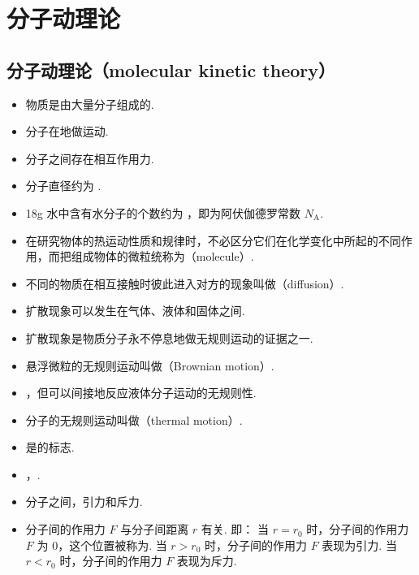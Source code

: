 \section{分子动理论}

\subsection{分子动理论（molecular kinetic theory）}
\vspace{10pt}
\begin{itemize}
\item 物质是由大量分子组成的.
\item 分子在地做运动.
\item 分子之间存在相互作用力.
\item 分子直径约为 .
\item 18g 水中含有水分子的个数约为 ，即为阿伏伽德罗常数 $N_{\text{A}}$.
\item 在研究物体的热运动性质和规律时，不必区分它们在化学变化中所起的不同作用，而把组成物体的微粒统称为（molecule）.
\item 不同的物质在相互接触时彼此进入对方的现象叫做（diffusion）.
\item 扩散现象可以发生在气体、液体和固体之间.
\item 扩散现象是物质分子永不停息地做无规则运动的证据之一.
\item 悬浮微粒的无规则运动叫做（Brownian motion）.
\item {}，但可以间接地反应液体分子运动的无规则性.
\item 分子的无规则运动叫做（thermal motion）. 
\item {}是的标志.
\item {}，.
\item 分子之间，引力和斥力.
\item 分子间的作用力 $F$ 与分子间距离 $r$ 有关. 即：
\newline 当 $r=r_0$ 时，分子间的作用力 $F$ 为 0，这个位置被称为.
\newline 当 $r>r_0$ 时，分子间的作用力 $F$ 表现为引力.
\newline 当 $r<r_0$ 时，分子间的作用力 $F$ 表现为斥力.
\begin{figure}[H]
	\centering
	\begin{tikzpicture}

\end{tikzpicture}
\end{figure}
\end{itemize}
